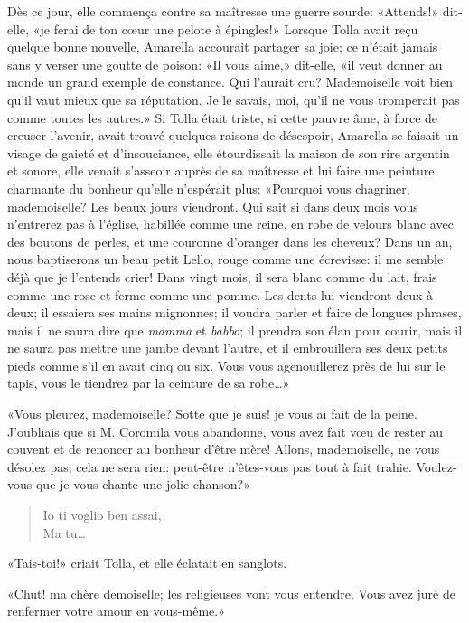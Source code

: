Dès ce jour, elle commença contre sa maîtresse une guerre sourde: «Attends!» dit-elle, «je ferai de ton c\oe{}ur une pelote à épingles!» Lorsque Tolla avait reçu quelque bonne nouvelle, Amarella accourait partager sa joie; ce n'était jamais sans y verser une goutte de poison: «Il vous aime,» dit-elle, «il veut donner au monde un grand exemple de constance. Qui l'aurait cru? Mademoiselle voit bien qu'il vaut mieux que sa réputation. Je le savais, moi, qu'il ne vous tromperait pas comme toutes les autres.» Si Tolla était triste, si cette pauvre âme, à force de creuser l'avenir, avait trouvé quelques raisons de désespoir, Amarella se faisait un visage de gaieté et d'insouciance, elle étourdissait la maison de son rire argentin et sonore, elle venait s'asseoir auprès de sa maîtresse et lui faire une peinture charmante du bonheur qu'elle n'espérait plus: «Pourquoi vous chagriner, mademoiselle? Les beaux jours viendront. Qui sait si dans deux mois vous n'entrerez pas à l'église, habillée comme une reine, en robe de velours blanc avec des boutons de perles, et une couronne d'oranger dans les cheveux? Dans un an, nous baptiserons un beau petit Lello, rouge comme une écrevisse: il me semble déjà que je l'entends crier! Dans vingt mois, il sera blanc comme du lait, frais comme une rose et ferme comme une pomme. Les dents lui viendront deux à deux; il essaiera ses mains mignonnes; il voudra parler et faire de longues phrases, mais il ne saura dire que \emph{mamma} et \emph{babbo}; il prendra son élan pour courir, mais il ne saura pas mettre une jambe devant l'autre, et il embrouillera ses deux petits pieds comme s'il en avait cinq ou six. Vous vous agenouillerez près de lui sur le tapis, vous le tiendrez par la ceinture de sa robe\ldots{}»

«Vous pleurez, mademoiselle? Sotte que je suis! je vous ai fait de la peine. J'oubliais que si M. Coromila vous abandonne, vous avez fait v\oe{}u de rester au couvent et de renoncer au bonheur d'être mère! Allons, mademoiselle, ne vous désolez pas; cela ne sera rien: peut-être n'êtes-vous pas tout à fait trahie. Voulez-vous que je vous chante une jolie chanson?»

\begin{quote}
Io ti voglio ben assai,\\
Ma tu\ldots{}
\end{quote}

«Tais-toi!» criait Tolla, et elle éclatait en sanglots.

«Chut! ma chère demoiselle; les religieuses vont vous entendre. Vous avez juré de renfermer votre amour en vous-même.»

